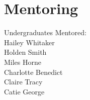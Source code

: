 \section*{Mentoring}
Undergraduates Mentored: \\
Hailey Whitaker \\
Holden Smith \\
Miles Horne \\
Charlotte Benedict \\
Claire Tracy \\
Catie George \\